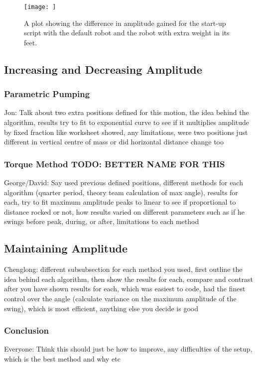 \documentclass[11pt]{article}
\begin{document}
    \begin{figure}
        \centering
        \texttt{[image: ]}
        \caption{A plot showing the difference in amplitude gained for the start-up script with the default robot and the robot with extra weight in its feet.}
        \label{fig:startupcomparison}
    \end{figure}



\subsection{Increasing and Decreasing Amplitude}
\subsubsection{Parametric Pumping}
Jon: Talk about two extra positions defined for this motion, the idea behind the algorithm, results try to fit to exponential curve to see if it multiplies amplitude by fixed fraction like worksheet showed, any limitations, were two positions just different in vertical centre of mass or did horizontal distance change too
\subsubsection{Torque Method TODO: BETTER NAME FOR THIS}
George/David: Say used previous defined positions, different methods for each algorithm (quarter period, theory team calculation of max angle), results for each, try to fit maximum amplitude peaks to linear to see if proportional to distance rocked or not, how results varied on different parameters such as if he swings before peak, during, or after, limitations to each method

\subsection{Maintaining Amplitude}
Chenglong: different subsubsection for each method you used, first outline the idea behind each algorithm, then show the results for each, compare and contrast after you have shown results for each, which was easiest to code, had the finest control over the angle (calculate variance on the maximum amplitude of the swing), which is most efficient, anything else you decide is good

\subsubsection{Conclusion}
Everyone: Think this should just be how to improve, any difficulties of the setup, which is the best method and why etc
\end{document}
